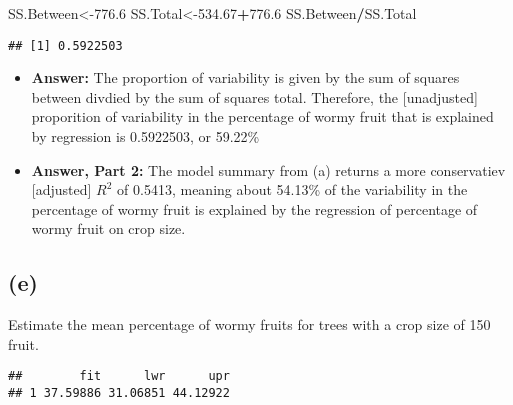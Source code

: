\documentclass[]{article}
\newenvironment{Shaded}{\begin{snugshade}}{\end{snugshade}}
\newcommand{\KeywordTok}[1]{\textcolor[rgb]{0.13,0.29,0.53}{\textbf{#1}}}
\newcommand{\DataTypeTok}[1]{\textcolor[rgb]{0.13,0.29,0.53}{#1}}
\newcommand{\DecValTok}[1]{\textcolor[rgb]{0.00,0.00,0.81}{#1}}
\newcommand{\FloatTok}[1]{\textcolor[rgb]{0.00,0.00,0.81}{#1}}
\newcommand{\StringTok}[1]{\textcolor[rgb]{0.31,0.60,0.02}{#1}}
\newcommand{\CommentTok}[1]{\textcolor[rgb]{0.56,0.35,0.01}{\textit{#1}}}
\newcommand{\OperatorTok}[1]{\textcolor[rgb]{0.81,0.36,0.00}{\textbf{#1}}}
\newcommand{\NormalTok}[1]{#1}
\begin{document}
\begin{Shaded}
\begin{Highlighting}[]
\NormalTok{SS.Between<-}\FloatTok{776.6}
\NormalTok{SS.Total<-}\FloatTok{534.67}\OperatorTok{+}\FloatTok{776.6}
\NormalTok{SS.Between}\OperatorTok{/}\NormalTok{SS.Total}
\end{Highlighting}
\end{Shaded}

\begin{verbatim}
## [1] 0.5922503
\end{verbatim}

\begin{itemize}
\item
  \textbf{Answer:} The proportion of variability is given by the sum of
  squares between divdied by the sum of squares total. Therefore, the
  {[}unadjusted{]} proporition of variability in the percentage of wormy
  fruit that is explained by regression is 0.5922503, or 59.22\%
\item
  \textbf{Answer, Part 2:} The model summary from (a) returns a more
  conservatiev {[}adjusted{]} \(R^2\) of 0.5413, meaning about 54.13\%
  of the variability in the percentage of wormy fruit is explained by
  the regression of percentage of wormy fruit on crop size.
\end{itemize}

\subsection{(e)}\label{e-1}

Estimate the mean percentage of wormy fruits for trees with a crop size
of 150 fruit.

\begin{Shaded}
\end{Shaded}

\begin{verbatim}
##        fit      lwr      upr
## 1 37.59886 31.06851 44.12922
\end{verbatim}
\end{document}
